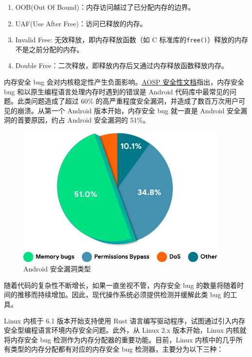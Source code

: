 \documentclass[AutoFakeBold]{LZUThesis}
\begin{document}
\begin{sloppypar}
\begin{enumerate}
\def\labelenumi{\arabic{enumi}.}
\item
  OOB(Out Of Bound)：内存访问越过了已分配内存的边界。
\item
  UAF(Use After Free)：访问已释放的内存。
\item
  Invalid Free: 无效释放，即内存释放函数（如 C
  标准库的\texttt{free()}）释放的内存不是之前分配的内存。
\item
  Double Free：二次释放，即释放内存后又通过内存释放函数释放内存。
\end{enumerate}

内存安全 bug
会对内核稳定性产生负面影响。\href{https://source.android.google.cn/docs/security/memory-safety?hl=zh-cn}{AOSP
安全性文档}指出，内存安全 bug 和以原生编程语言处理内存时遇到的错误是
Android 代码库中最常见的问题。此类问题造成了超过 60\%
的高严重程度安全漏洞，并造成了数百万次用户可见的崩溃。从第一个 Android
版本开始，内存安全 bug 就一直是 Android 安全漏洞的首要原因，约占 Android
安全漏洞的 51\%。

\begin{figure}[htb]
\centering
\includegraphics[width=300pt]{images/Android-security-report.png}
\caption{Android 安全漏洞类型}
\end{figure}

随着代码的复杂性不断增长，如果一直坐视不管，内存安全 bug
的数量将随着时间的推移而持续增加。因此，现代操作系统必须提供检测并缓解此类
bug 的工具。

Linux 内核于 6.1 版本开始支持使用 Rust
语言编写驱动程序，试图通过引入内存安全型编程语言环境内存安全问题。此外，从
Linux 2.x 版本开始，Linux 内核就将内存安全 bug
检测作为内存分配器的重要功能。目前，Linux
内核中的几乎所有类型的内存分配都有对应的内存安全 bug
检测器，主要分为以下三种：


\end{sloppypar}
\end{document}
